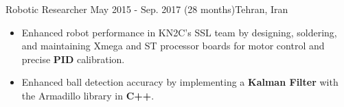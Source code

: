 \resumeSubheadingReza
{Robotic Researcher}{}
{May 2015 - Sep. 2017 (28 months)}{Tehran, Iran}
{
    \vspace{-12pt}
    \begin{itemize}
        \item{Enhanced robot performance in KN2C's SSL team by designing, soldering, and maintaining Xmega and ST processor boards for motor control and precise \textbf{PID} calibration.}
        \item{Enhanced ball detection accuracy by implementing a \textbf{Kalman Filter} with the Armadillo library in \textbf{C++}.}
    \end{itemize}
}
